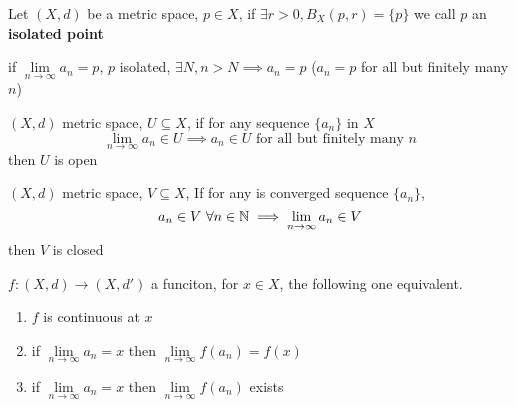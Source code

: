 \begin{definition}
  Let $(X, d)$ be a metric space, $p \in X$, if $\exists r > 0, B_X(p, r) = \{p\}$
  we call $p$ an \textbf{isolated point}
\end{definition}

\begin{theorem}
  if $\lim\limits_{n \to \infty} a_n = p$, $p$ isolated, $\exists N, n > N \implies a_n = p$ 
  ($a_n = p$ for all but finitely many $n$)
\end{theorem}

\begin{theorem}
  $(X, d)$ metric space, $U \subseteq X$, if for any sequence $\{a_n\}$ in $X$
  $$\lim\limits_{n \to \infty} a_n \in U \implies a_n \in U \text{ for all but finitely many }n$$
  then $U$ is open
\end{theorem}

\begin{theorem}
  $(X, d)$ metric space, $V \subseteq X$, If for any is converged sequence $\{a_n\}$, 
  $$a_n \in V\ \forall n \in \mathbb N \implies \lim\limits_{n \to \infty} a_n \in V$$
  then $V$ is closed
\end{theorem}

\begin{theorem}
  $f: (X, d) \to (X, d')$ a funciton, for $x \in X$, the following one equivalent.
  \begin{enumerate}
    \item $f$ is continuous at $x$
    \item if $\lim\limits_{n \to \infty} a_n = x$ then $\lim\limits_{n \to \infty} f(a_n) = f(x)$
    \item if $\lim\limits_{n \to \infty} a_n = x$ then $\lim\limits_{n \to \infty} f(a_n)$ exists
  \end{enumerate}
\end{theorem}